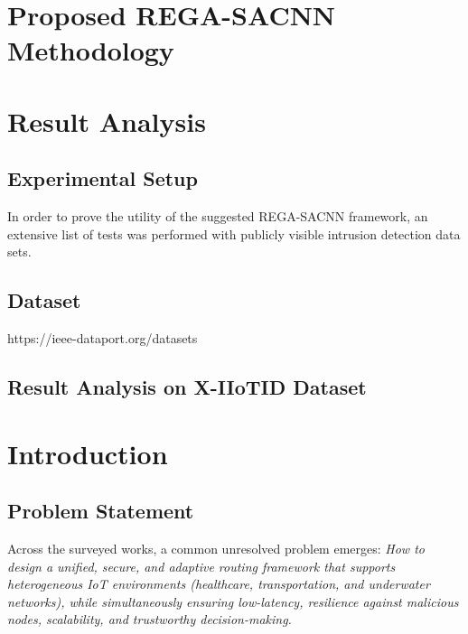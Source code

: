 \documentclass[a4paper,fleqn]{cas-dc}
\numberwithin{equation}{section}
\begin{document}
\section{Proposed REGA-SACNN Methodology}


\section{Result Analysis}

\subsection{Experimental Setup}

In order to prove the utility of the suggested REGA-SACNN framework, an extensive list of tests was performed with publicly visible intrusion detection data sets. 


\subsection{Dataset}

https://ieee-dataport.org/datasets


\subsection{Result Analysis on X-IIoTID Dataset}




















\section{Introduction}

\subsection{Problem Statement}
Across the surveyed works, a common unresolved problem emerges:  
\emph{How to design a unified, secure, and adaptive routing framework that supports heterogeneous IoT environments (healthcare, transportation, and underwater networks), while simultaneously ensuring low-latency, resilience against malicious nodes, scalability, and trustworthy decision-making.}  
\end{document}
